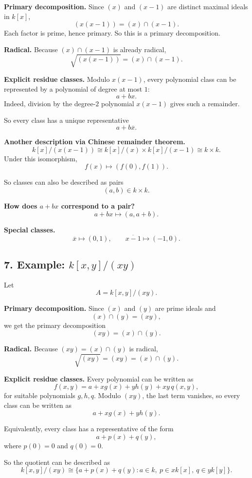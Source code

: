 \documentclass[12pt,a4paper]{article}
\theoremstyle{notespace}
\begin{document}
\textbf{Primary decomposition.}
Since \((x)\) and \((x-1)\) are distinct maximal ideals in \(k[x]\),
\[
(x(x-1))=(x)\cap(x-1).
\]
Each factor is prime, hence primary.
So this is a primary decomposition.

\textbf{Radical.}
Because \((x)\cap(x-1)\) is already radical,
\[
\sqrt{(x(x-1))}=(x)\cap(x-1).
\]

\textbf{Explicit residue classes.}
Modulo \(x(x-1)\), every polynomial class can be represented by a polynomial of degree at most \(1\):
\[
a+bx.
\]
Indeed, division by the degree-\(2\) polynomial \(x(x-1)\) gives such a remainder.

So every class has a unique representative
\[
a+b\overline x.
\]

\textbf{Another description via Chinese remainder theorem.}
\[
k[x]/(x(x-1))\cong k[x]/(x)\times k[x]/(x-1)\cong k\times k.
\]
Under this isomorphism,
\[
f(x)\longmapsto (f(0),f(1)).
\]

So classes can also be described as pairs
\[
(a,b)\in k\times k.
\]

\textbf{How does \(a+bx\) correspond to a pair?}
\[
a+bx \longmapsto (a,a+b).
\]

\textbf{Special classes.}
\[
\overline x \longmapsto (0,1),\qquad \overline{x-1}\longmapsto (-1,0).
\]

\subsection*{7. Example: \(k[x,y]/(xy)\)}

Let
\[
A=k[x,y]/(xy).
\]

\textbf{Primary decomposition.}
Since \((x)\) and \((y)\) are prime ideals and
\[
(x)\cap(y)=(xy),
\]
we get the primary decomposition
\[
(xy)=(x)\cap(y).
\]

\textbf{Radical.}
Because \((xy)=(x)\cap(y)\) is radical,
\[
\sqrt{(xy)}=(xy)=(x)\cap(y).
\]

\textbf{Explicit residue classes.}
Every polynomial can be written as
\[
f(x,y)=a + xg(x) + yh(y) + xy\,q(x,y),
\]
for suitable polynomials \(g,h,q\).
Modulo \((xy)\), the last term vanishes, so every class can be written as
\[
a + xg(x) + yh(y).
\]

Equivalently, every class has a representative of the form
\[
a + p(x) + q(y),
\]
where \(p(0)=0\) and \(q(0)=0\).

So the quotient can be described as
\[
k[x,y]/(xy)\cong \{a+p(x)+q(y):a\in k,\ p\in xk[x],\ q\in yk[y]\}.
\]
\end{document}

